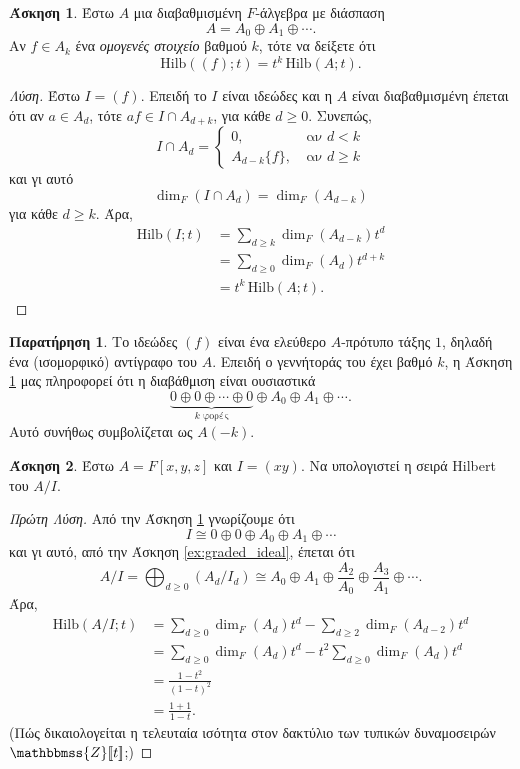 \documentclass[12pt,a4paper,reqno]{amsart}
\theoremstyle{definition}
\newtheorem{exercise}{Άσκηση}
\newtheorem*{remark}{Παρατήρηση}
\newcommand{\ZZ}{\mathbbmss{Z}}
\newcommand{\Hilb}{\mathrm{Hilb}}
\begin{document}
\begin{exercise}
  \label{ex:free_module_generated_in_degree}
  Έστω $A$ μια διαβαθμισμένη $F$-άλγεβρα με διάσπαση 
  \[
  A = A_0 \oplus A_1 \oplus \cdots.
  \] 
  Αν $f \in A_k$ ένα \emph{ομογενές στοιχείο} βαθμού $k$, τότε να δείξετε ότι
  \[
  \Hilb((f);t) = t^k \, \Hilb(A;t).
  \]
\end{exercise}

\begin{proof}[Λύση]
  Έστω $I = (f)$. Επειδή το $I$ είναι ιδεώδες και η $A$ είναι διαβαθμισμένη έπεται ότι αν $a \in A_d$, τότε $af \in I \cap A_{d+k}$, για κάθε $d \ge 0$. Συνεπώς, 
  \[
  I \cap A_d = 
  \begin{cases}
    0, &\ \text{αν $d < k$} \\
    A_{d-k}\{f\}, &\ \text{αν $d \ge k$}
  \end{cases}
  \]
  και γι αυτό 
  \[
  \dim_F\left(
    I \cap A_d
  \right) = \dim_F\left(
    A_{d-k}
  \right)
  \]
  για κάθε $d \ge k$. Άρα, 
  \begin{align*}
  \Hilb(I;t) &= \sum_{d \ge k} \dim_F\left(
    A_{d-k}
  \right) t^d \\ 
  &= \sum_{d\ge0} \dim_F\left(
    A_{d}
  \right) t^{d+k} \\ 
  &= t^k \, \Hilb(A;t).
  \end{align*}
\end{proof}

\begin{remark}
  Το ιδεώδες $(f)$ είναι ένα ελεύθερο $A$-πρότυπο τάξης $1$, δηλαδή ένα (ισομορφικό) αντίγραφο του $A$. Επειδή ο γεννήτοράς του έχει βαθμό $k$, η Άσκηση \ref{ex:free_module_generated_in_degree} μας πληροφορεί ότι η διαβάθμιση είναι ουσιαστικά 
  \[
  \underbrace{0 \oplus 0 \oplus \cdots \oplus 0}_{\text{$k$ φορές}} \oplus A_0 \oplus A_1 \oplus \cdots.
  \] 
  Αυτό συνήθως συμβολίζεται ως $A(-k)$.
\end{remark}

\begin{exercise}
  \label{ex:hilbertSeries_xy}
  Έστω $A = F[x,y,z]$ και $I = (xy)$. Να υπολογιστεί η σειρά Hilbert του $A/I$.
\end{exercise}

\begin{proof}[Πρώτη Λύση]
  Από την Άσκηση \ref{ex:free_module_generated_in_degree} γνωρίζουμε ότι 
  \[
  I \cong 0 \oplus 0 \oplus A_0 \oplus A_1 \oplus \cdots
  \]
  και γι αυτό, από την Άσκηση \ref{ex:graded_ideal}, έπεται ότι 
  \[
  A/I = \bigoplus_{d \ge 0} \left(
    A_d/I_d
  \right) 
  \cong A_0 \oplus A_1 \oplus \frac{A_2}{A_0} \oplus \frac{A_3}{A_1} \oplus \cdots.
  \]
  Άρα,
  \begin{align*}
  \Hilb(A/I;t) &= \sum_{d \ge 0} \dim_F(A_d) t^d - \sum_{d\ge2}\dim_F(A_{d-2}) t^d \\
  &= \sum_{d \ge 0} \dim_F(A_d) t^d - t^2\sum_{d\ge0}\dim_F(A_{d}) t^d \\
  &= \frac{1-t^2}{(1-t)^2} \\
  &= \frac{1+1}{1-t}.
  \end{align*}
  (Πώς δικαιολογείται η τελευταία ισότητα στον δακτύλιο των τυπικών δυναμοσειρών $\ZZ[\![t]\!]$;)
\end{proof}
\end{document}
